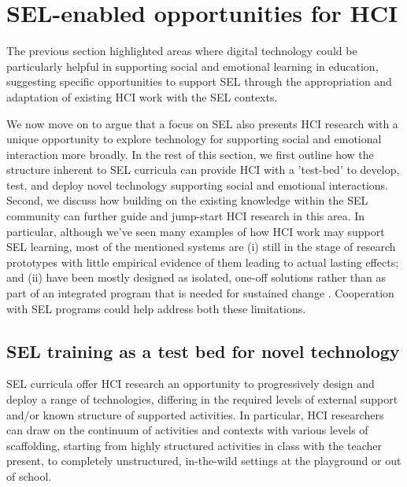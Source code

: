 \documentclass[prodmode,acmtochi]{acmsmall}
\newcommand{\revision}[1]{#1}
\begin{document}



\section{SEL-enabled opportunities for HCI} %
\label{sec:HCIopportunities}
The previous section highlighted areas where digital technology could be particularly helpful in supporting social and emotional learning in education, suggesting specific opportunities to support SEL through the appropriation and adaptation of existing HCI work with the SEL contexts. 

We now move on to argue that a focus on SEL also presents HCI research with a unique opportunity to explore technology for supporting social and emotional interaction more broadly.
%
In the rest of this section, we first outline how the structure inherent to SEL curricula can provide HCI with a 'test-bed' to develop, test, and deploy novel technology supporting social and emotional interactions.  Second, we discuss how building on the existing knowledge within the SEL community can further guide and jump-start HCI research in this area. \revision{ In particular, although we've seen many examples of how HCI work may support SEL learning, most of the mentioned systems are (i) still in the stage of research prototypes with little empirical evidence of them leading to actual lasting effects; and (ii) have been mostly designed as isolated, one-off solutions rather than as part of an integrated program that is needed for sustained change \cite[p. 13]{Zins2004}. Cooperation with SEL programs could help address both these limitations. }


%
\subsection{SEL training as a test bed for novel technology}
SEL curricula offer HCI research an opportunity to progressively design and deploy a range of technologies, differing in the required levels of external support and/or known structure of supported activities. In particular, HCI researchers can draw on the continuum of activities and contexts with various levels of scaffolding, starting from highly structured activities in class with the teacher present, to completely unstructured, in-the-wild settings at the playground or out of school.  
\end{document}
